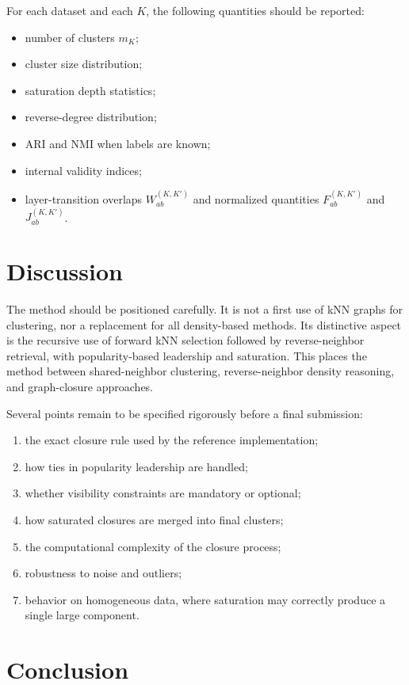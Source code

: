 \documentclass[pdflatex,sn-mathphys-num]{sn-jnl}
\theoremstyle{thmstyleone}
\theoremstyle{thmstyletwo}
\theoremstyle{thmstylethree}
\begin{document}
For each dataset and each $K$, the following quantities should be reported:
\begin{itemize}
    \item number of clusters $m_K$;
    \item cluster size distribution;
    \item saturation depth statistics;
    \item reverse-degree distribution;
    \item ARI and NMI when labels are known;
    \item internal validity indices;
    \item layer-transition overlaps $W_{ab}^{(K,K')}$ and normalized quantities $F_{ab}^{(K,K')}$ and $J_{ab}^{(K,K')}$.
\end{itemize}

\section{Discussion}\label{sec:discussion}

The method should be positioned carefully. It is not a first use of kNN graphs for clustering, nor a replacement for all density-based methods. Its distinctive aspect is the recursive use of forward kNN selection followed by reverse-neighbor retrieval, with popularity-based leadership and saturation. This places the method between shared-neighbor clustering, reverse-neighbor density reasoning, and graph-closure approaches.

Several points remain to be specified rigorously before a final submission:
\begin{enumerate}
    \item the exact closure rule used by the reference implementation;
    \item how ties in popularity leadership are handled;
    \item whether visibility constraints are mandatory or optional;
    \item how saturated closures are merged into final clusters;
    \item the computational complexity of the closure process;
    \item robustness to noise and outliers;
    \item behavior on homogeneous data, where saturation may correctly produce a single large component.
\end{enumerate}

\section{Conclusion}\label{sec:conclusion}
\end{document}
